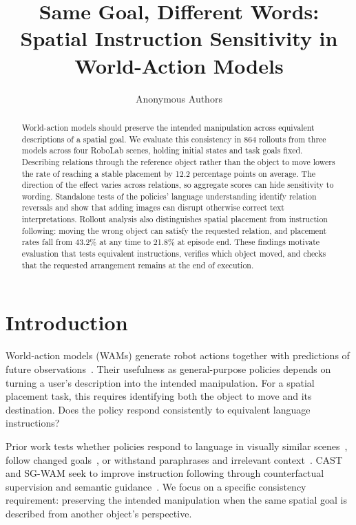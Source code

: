 \documentclass{article}
\title{Same Goal, Different Words:\\Spatial Instruction Sensitivity in World-Action Models}
\author{Anonymous Authors}
\begin{document}
\maketitle
\begin{abstract}
World-action models should preserve the intended manipulation across equivalent descriptions of a spatial goal. We evaluate this consistency in 864 rollouts from three models across four RoboLab scenes, holding initial states and task goals fixed. Describing relations through the reference object rather than the object to move lowers the rate of reaching a stable placement by 12.2 percentage points on average. The direction of the effect varies across relations, so aggregate scores can hide sensitivity to wording. Standalone tests of the policies' language understanding identify relation reversals and show that adding images can disrupt otherwise correct text interpretations. Rollout analysis also distinguishes spatial placement from instruction following: moving the wrong object can satisfy the requested relation, and placement rates fall from 43.2\% at any time to 21.8\% at episode end. These findings motivate evaluation that tests equivalent instructions, verifies which object moved, and checks that the requested arrangement remains at the end of execution.

\end{abstract}

\setlength{\parskip}{2.5pt}
\setlength{\intextsep}{8pt plus 2pt minus 2pt}
\setlength{\textfloatsep}{12pt plus 2pt minus 2pt}
\section{Introduction}
World-action models (WAMs) generate robot actions together with predictions of future observations~\citep{kim2026cosmospolicy}. Their usefulness as general-purpose policies depends on turning a user's description into the intended manipulation. For a spatial placement task, this requires identifying both the object to move and its destination. Does the policy respond consistently to equivalent language instructions?

Prior work tests whether policies respond to language in visually similar scenes~\citep{tri2025lbm}, follow changed goals~\citep{fang2026counterfactual}, or withstand paraphrases and irrelevant context~\citep{fei2026liberoplus,kim2026liberopara,moskalenko2026bring}. CAST and SG-WAM seek to improve instruction following through counterfactual supervision and semantic guidance~\citep{glossop2025cast,he2026sgwam}. We focus on a specific consistency requirement: preserving the intended manipulation when the same spatial goal is described from another object's perspective.
\end{document}
